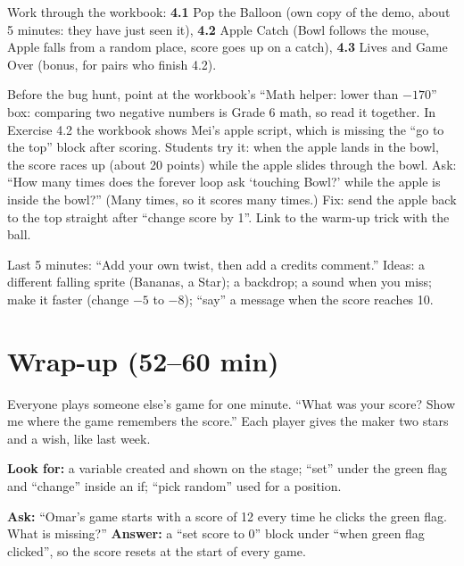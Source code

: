 Work through the workbook: \textbf{4.1} Pop the Balloon (own copy of the demo, about 5 minutes: they have just seen it), \textbf{4.2} Apple Catch (Bowl follows the mouse, Apple falls from a random place, score goes up on a catch), \textbf{4.3} Lives and Game Over (bonus, for pairs who finish 4.2).

\begin{bughunt}
Before the bug hunt, point at the workbook's \enquote{Math helper: lower than $-170$} box: comparing two negative numbers is Grade 6 math, so read it together. In Exercise 4.2 the workbook shows Mei's apple script, which is missing the \enquote{go to the top} block after scoring. Students try it: when the apple lands in the bowl, the score races up (about 20 points) while the apple slides through the bowl. Ask: \enquote{How many times does the forever loop ask \enquote{touching Bowl?} while the apple is inside the bowl?} (Many times, so it scores many times.) Fix: send the apple back to the top straight after \enquote{change score by 1}. Link to the warm-up trick with the ball.
\end{bughunt}

\begin{freebuild}
Last 5 minutes: \enquote{Add your own twist, then add a credits comment.} Ideas: a different falling sprite (Bananas, a Star); a backdrop; a sound when you miss; make it faster (change $-5$ to $-8$); \enquote{say} a message when the score reaches 10.
\end{freebuild}

\section{Wrap-up (52--60 min)}
\begin{teacherscript}
Everyone plays someone else's game for one minute. \enquote{What was your score? Show me where the game remembers the score.} Each player gives the maker two stars and a wish, like last week.
\end{teacherscript}

\begin{formativecheck}
\textbf{Look for:} a variable created and shown on the stage; \enquote{set} under the green flag and \enquote{change} inside an if; \enquote{pick random} used for a position.

\textbf{Ask:} \enquote{Omar's game starts with a score of 12 every time he clicks the green flag. What is missing?}
\textbf{Answer:} a \enquote{set score to 0} block under \enquote{when green flag clicked}, so the score resets at the start of every game.
\end{formativecheck}

